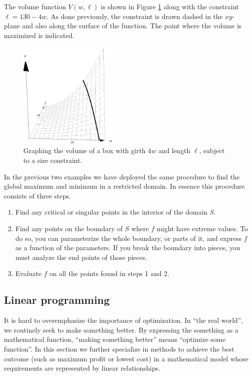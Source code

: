 \begin{example}
The volume function $V(w,\ell)$ is shown in Figure \ref{fig_multi_var_28} along with the constraint $\ell = 130-4w$. As done previously, the constraint is drawn dashed in the $xy$-plane and also along the surface of the function. The point where the volume is maximized is indicated.

\begin{figure}[H]
\centering
\includegraphics[width=0.43\textwidth]{fig_multi_var_28}
\caption{Graphing the volume of a box with girth $4w$ and length $\ell$, subject to a size constraint.}
\label{fig_multi_var_28}
\end{figure}


\end{example}

In the previous two examples we have deployed the same procedure to find the global maximum and minimum in a restricted domain. In essence this procedure consists of three steps. 
\begin{enumerate}
\item Find any critical or singular points in the interior of the domain $S$.
\item Find any points on the boundary of $S$ where $f$ might have extreme values. To do so, you can parameterize the whole boundary, or parts of it, and express $f$ as a function of the parameters. If you break the boundary into pieces, you must analyze the end points of those pieces. 
\item Evaluate $f$ on all the points found in steps 1 and 2. 
\end{enumerate}


\subsection{Linear programming}
\label{LP}
It is hard to overemphasize the importance of optimization. In ``the real world'', we routinely seek to make something better. By expressing the something as a mathematical function, ``making something better'' means ``optimize some function''.  In this section we further specialize in methods to achieve the best outcome (such as maximum profit or lowest cost) in a mathematical model whose requirements are represented by linear relationships. 

